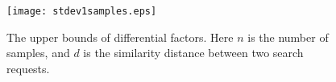 \documentclass{IEEEtran}
\begin{document}
\begin{figure}
\centering
\texttt{[image: stdev1samples.eps]}
\caption{The upper bounds of differential factors. Here $n$ is the number of samples, and $d$ is the similarity distance between two search requests.}
\label{fig:diff_factors}
\end{figure}



\end{document}
